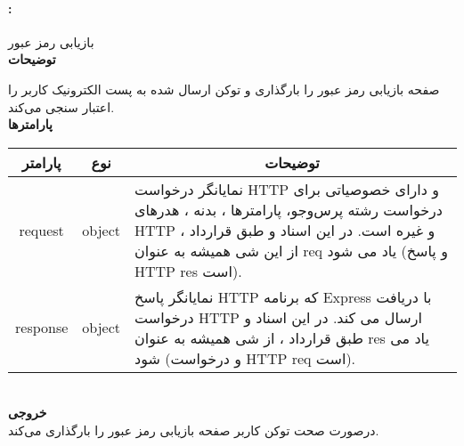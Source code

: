 \paragraph{:}
بازیابی رمز عبور
\\
\textbf{توضیحات}
\hr
\begin{flushleft}
	\framebox[.9\textwidth][l]{
		\lr{
			\textcolor{type}{void}
			\textcolor{func}{getRecover}
			\textcolor{symb}{(}
			\textcolor{type}{object}
			\textcolor{arg}{request}
			\textcolor{symb}{,}
			\textcolor{type}{object}
			\textcolor{arg}{response}
			\textcolor{symb}{);}
		}
	}
\end{flushleft}
صفحه بازیابی رمز عبور را بارگذاری و توکن ارسال شده به پست الکترونیک کاربر را اعتبار سنجی می‌کند.
\\
\textbf{پارامترها}
\hr \\[10pt]
\begin{tabular}{|m{4cm}|m{3cm}|m{10cm}|}
	\hline
	\multicolumn{1}{|c}{پارامتر}
	&
	\multicolumn{1}{|c}{نوع}
	&
	\multicolumn{1}{|c|}{توضیحات}
	\\
	\hline
	\multicolumn{1}{|c}{request}
	&
	\multicolumn{1}{|c|}{object}
	&
	نمایانگر درخواست HTTP و دارای خصوصیاتی برای درخواست رشته پرس‌و‌جو، پارامترها ، بدنه ، هدرهای HTTP و غیره است.
	در این اسناد و طبق قرارداد ، از این شی همیشه به عنوان req یاد می شود (و پاسخ HTTP res است).
	\\
	\hline
	\multicolumn{1}{|c}{response}
	&
	\multicolumn{1}{|c|}{object}
	&
	نمایانگر پاسخ HTTP که برنامه Express با دریافت درخواست HTTP ارسال می کند.
	در این اسناد و طبق قرارداد ، از شی همیشه به عنوان res یاد می شود (و درخواست HTTP req است).
	\\
	\hline
\end{tabular}
\\[10pt]
\textbf{خروجی}
\hr \\
درصورت صحت توکن کاربر  صفحه بازیابی رمز عبور را بارگذاری می‌کند.


